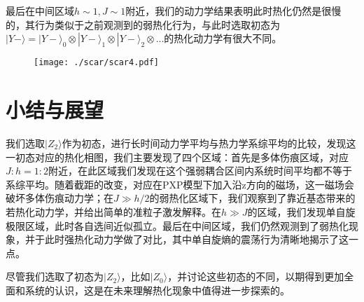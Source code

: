 最后在中间区域$h\sim 1, J \sim 1$附近，我们的动力学结果表明此时热化仍然是很慢的，其行为类似于之前观测到的弱热化行为，与此时选取初态为$|Y-\rangle = |Y-\rangle_0 \otimes|Y-\rangle_1\otimes |Y-\rangle_2 \otimes... $的热化动力学有很大不同。
\begin{figure}[h]
\centering
\texttt{[image: ./scar/scar4.pdf]}
\label{midweak}
\end{figure}




\section{小结与展望}
我们选取$|Z_2\rangle$作为初态，进行长时间动力学平均与热力学系综平均的比较，发现这一初态对应的热化相图，我们主要发现了四个区域：首先是多体伤痕区域，对应$J:h=1:2$附近，在此区域我们发现在这个强弱耦合区间内系统时间平均都不等于系综平均。随着截距的改变，对应在PXP模型下加入沿z方向的磁场，这一磁场会破坏多体伤痕动力学；在$J\gg h/2$的弱热化区域下，我们观察到了靠近基态带来的若热化动力学，并给出简单的准粒子激发解释。在$h\gg J$的区域，我们发现单自旋极限区域，此时各自选间近似孤立。最后在中间区域，我们仍然观测到了弱热化现象，并于此时强热化动力学做了对比，其中单自旋熵的震荡行为清晰地揭示了这一点。

尽管我们选取了初态为$|Z_2\rangle$，比如$|Z_0\rangle$，并讨论这些初态的不同，以期得到更加全面和系统的认识，这是在未来理解热化现象中值得进一步探索的。













